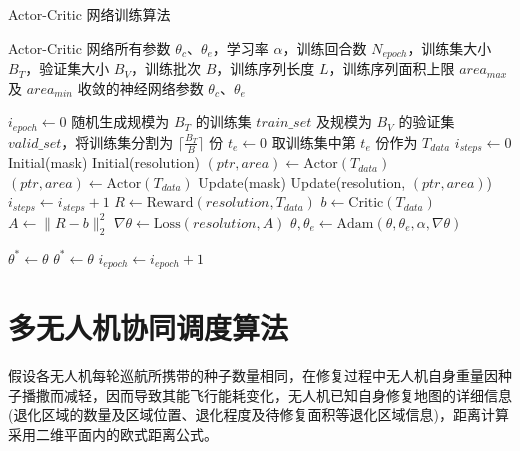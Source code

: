 \documentclass[AutoFakeBold]{LZUThesis}
\begin{document}
\begin{algorithm}[h]
	\begin{algorithmic}[1]
		\caption{Actor-Critic 网络训练算法} \label{alg:actor_critic}
		\Require Actor-Critic 网络所有参数 $\theta_c$、$\theta_e$，学习率 $\alpha$，训练回合数 $N_{epoch}$，训练集大小 $B_T$，验证集大小 $B_V$，训练批次 $B$，训练序列长度 $L$，训练序列面积上限 $area_{max}$ 及 $area_{min}$
		\Ensure 收敛的神经网络参数 $\theta_c$、$\theta_e$

		\State $i_{epoch} \leftarrow 0$
		\State 随机生成规模为 $B_T$ 的训练集 $train\_set$ 及规模为 $B_V$ 的验证集 $valid\_set$，将训练集分割为 $\lceil \frac{B_T}{B} \rceil$ 份
		\State $t_e \leftarrow 0$
		\State 取训练集中第 $t_e$ 份作为 $T_{data}$
		\State $i_{steps} \leftarrow 0$
		\State Initial(mask) 
		\State Initial(resolution) 
		\State $(ptr, area) \leftarrow \text{Actor}(T_{data})$ 
		\State $(ptr, area) \leftarrow \text{Actor}(T_{data})$ 
		\EndWhile
		\State Update(mask)
		\State Update(resolution, $(ptr, area)$)
		\State $i_{steps} \leftarrow i_{steps} + 1$
		\EndWhile
		\State $R \leftarrow \text{Reward}(resolution, T_{data})$ 
		\State $b \leftarrow \text{Critic}(T_{data})$ 
		\State $A \leftarrow \|R - b\|_2^2$ 
		\State $\nabla\theta \leftarrow \text{Loss}(resolution, A)$ 
		\State $\theta, \theta_e \leftarrow \text{Adam}(\theta, \theta_e, \alpha, \nabla\theta)$
		\EndFor

		\State $\theta^* \leftarrow \theta$
		\Else
		\State $\theta^* \leftarrow \theta$
		\EndIf
		\EndIf
		\State $i_{epoch} \leftarrow i_{epoch} + 1$
		\EndWhile
	\end{algorithmic}
\end{algorithm}

\chapter{多无人机协同调度算法}

假设各无人机每轮巡航所携带的种子数量相同，在修复过程中无人机自身重量因种子播撒而减轻，因而导致其能飞行能耗变化，无人机已知自身修复地图的详细信息(退化区域的数量及区域位置、退化程度及待修复面积等退化区域信息)，距离计算采用二维平面内的欧式距离公式。
\end{document}
